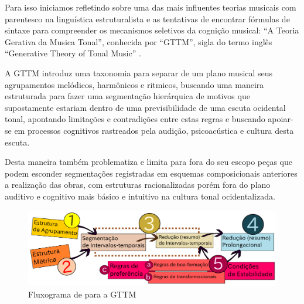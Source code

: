 \documentclass[
	12pt,				%
	openright,			%
	twoside,			%
	a4paper,			%
	english,			%
	french,				%
	spanish,			%
	brazil				%
	]{abntex2}
\begin{document}
Para isso iniciamos refletindo sobre uma das mais influentes teorias musicais com parentesco na linguística estruturalista e as tentativas de encontrar fórmulas de sintaxe para compreender os mecanismos seletivos da cognição musical: “A Teoria Gerativa da Musica Tonal”, conhecida por “GTTM”, sigla do termo inglês “Generative Theory of Tonal Music” \cite{lerdahl1983generative}.

A GTTM introduz uma taxonomia para separar de um plano musical seus agrupamentos melódicos, harmônicos e ritmicos, buscando uma maneira estruturada para fazer uma segmentação hierárquica de motivos que supostamente estariam dentro de uma previsibilidade de uma escuta ocidental tonal, apontando limitações e contradições entre estas regras e buscando apoiar-se em processos cognitivos rastreados pela audição, psicoacústica e cultura desta escuta. 

Desta maneira também problematiza e limita para fora do seu escopo peças que podem esconder segmentações registradas em esquemas composicionais anteriores a realização das obras, com estruturas racionalizadas porém fora do plano auditivo e cognitivo mais básico e intuitivo na cultura tonal ocidentalizada. 

\pagebreak
\begin{figure}[!h]
	\caption{\label{fig_grafico}Fluxograma de  para a GTTM}
	\begin{center}
	    \includegraphics[scale=0.5]{gttm/GTTM_rules.pdf}
	\end{center}
\end{figure}
\end{document}
